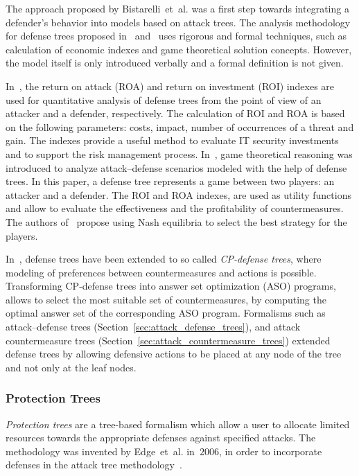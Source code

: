 \documentclass[a4paper]{article}
\begin{document}
The approach proposed by Bistarelli~et~al. was a first step towards integrating
a defender's behavior into models based on attack trees. The analysis
methodology for defense trees proposed in~\cite{BiFiPe} and~\cite{BiDaPe} uses
rigorous and formal techniques, such as calculation of economic indexes and game
theoretical solution concepts. However, the model itself is only introduced
verbally and a formal definition is not given.

In~\cite{BiFiPe}, the return on attack (ROA) and return on investment (ROI)
indexes are used for quantitative analysis of defense trees from the point of
view of an attacker and a defender, respectively. The calculation of ROI and ROA
is based on the following parameters: costs, impact, number of occurrences of a
threat and gain. The indexes provide a useful method to evaluate IT security
investments and to support the risk management process. In~\cite{BiDaPe}, game
theoretical reasoning was introduced to analyze attack--defense scenarios
modeled with the help of defense trees. In this paper, a defense tree represents
a game between two players: an attacker and a defender. The ROI and ROA indexes,
are used as utility functions and allow to evaluate the effectiveness and the
profitability of countermeasures. The authors of~\cite{BiDaPe} propose using
Nash equilibria to select the best strategy for the players.

In~\cite{BiPeTr}, defense trees have been extended to so called \emph{CP-defense
trees}, where modeling of preferences between countermeasures and actions is
possible. Transforming CP-defense trees into answer set optimization (ASO)
programs, allows to select the most suitable set of countermeasures, by
computing the optimal answer set of the corresponding ASO program. Formalisms
such as attack--defense trees  (Section~\ref{sec:attack_defense_trees}), and
attack countermeasure trees (Section~\ref{sec:attack_countermeasure_trees})
extended defense trees by allowing defensive actions to be placed at any node of
the tree and not only at the leaf nodes.

\subsubsection{Protection Trees} 
\label{sec:protection_trees}

\emph{Protection trees} are a tree-based formalism which allow a user to
allocate limited resources towards the appropriate defenses against specified 
attacks. The methodology was invented by Edge~et~al. in~$2006$, in order to
incorporate defenses in the attack tree methodology~\cite{EdDaRaMi}.
\end{document}
